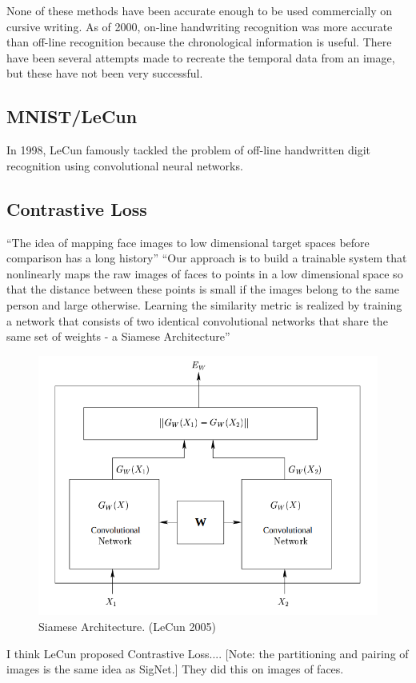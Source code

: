 None of these methods have been accurate enough to be used commercially on cursive writing\cite{handwriting_survey}.
As of 2000, on-line handwriting recognition was more accurate than off-line recognition because the chronological information is useful\cite{handwriting_survey}.
There have been several attempts made to recreate the temporal data from an image, but these have not been very successful\cite{handwriting_survey}.



\subsection{MNIST/LeCun}
In 1998, LeCun famously tackled the problem of off-line handwritten digit recognition using convolutional neural networks\cite{mnist}.


\subsection{Contrastive Loss}
``The idea of mapping face images to low dimensional target spaces before comparison has a long history''
``Our approach is to build a trainable system that nonlinearly maps the raw images of faces to points in a low dimensional space so that the distance between these points is
small if the images belong to the same person and large otherwise. Learning the similarity metric is realized by training a network that consists of two identical convolutional
networks that share the same set of weights - a Siamese Architecture''
\begin{figure}[h]
    \begin{center}
        \includegraphics[width=0.8\linewidth]{siamese_architecture.png}
    \end{center}
    \caption{Siamese Architecture. (LeCun 2005)}
    \label{fig:siamese}
\end{figure}
I think LeCun proposed Contrastive Loss...\cite{LeCun}.
[Note: the partitioning and pairing of images is the same idea as SigNet.]
They did this on images of faces.

